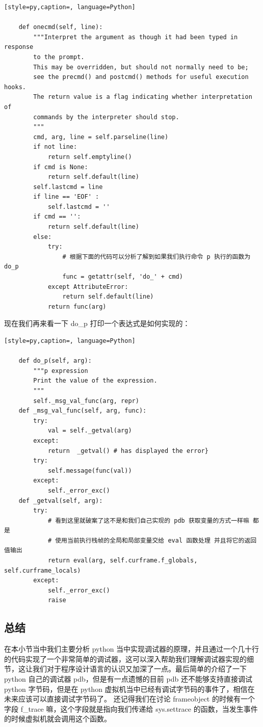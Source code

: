 \begin{lstlisting}[style=py,caption=, language=Python]

    def onecmd(self, line):
        """Interpret the argument as though it had been typed in response
        to the prompt.
        This may be overridden, but should not normally need to be;
        see the precmd() and postcmd() methods for useful execution hooks.
        The return value is a flag indicating whether interpretation of
        commands by the interpreter should stop.
        """
        cmd, arg, line = self.parseline(line)
        if not line:
            return self.emptyline()
        if cmd is None:
            return self.default(line)
        self.lastcmd = line
        if line == 'EOF' :
            self.lastcmd = ''
        if cmd == '':
            return self.default(line)
        else:
            try:
                # 根据下面的代码可以分析了解到如果我们执行命令 p 执行的函数为 do_p
                func = getattr(self, 'do_' + cmd)
            except AttributeError:
                return self.default(line)
            return func(arg)
\end{lstlisting}
现在我们再来看一下 do\_p 打印一个表达式是如何实现的：
\begin{lstlisting}[style=py,caption=, language=Python]

    def do_p(self, arg):
        """p expression
        Print the value of the expression.
        """
        self._msg_val_func(arg, repr)
    def _msg_val_func(self, arg, func):
        try:
            val = self._getval(arg)
        except:
            return  _getval() # has displayed the error}
        try:
            self.message(func(val))
        except:
            self._error_exc()
    def _getval(self, arg):
        try:
            # 看到这里就破案了这不是和我们自己实现的 pdb 获取变量的方式一样嘛 都是
            # 使用当前执行栈帧的全局和局部变量交给 eval 函数处理 并且将它的返回值输出
            return eval(arg, self.curframe.f_globals, self.curframe_locals)
        except:
            self._error_exc()
            raise
\end{lstlisting}
\subsection{总结}
在本小节当中我们主要分析 python 当中实现调试器的原理，并且通过一个几十行的代码实现了一个非常简单的调试器，这可以深入帮助我们理解调试器实现的细节，这让我们对于程序设计语言的认识又加深了一点。最后简单的介绍了一下 python 自己的调试器 pdb，但是有一点遗憾的目前 pdb 还不能够支持直接调试 python 字节码，但是在 python 虚拟机当中已经有调试字节码的事件了，相信在未来应该可以直接调试字节码了。
还记得我们在讨论 frameobject 的时候有一个字段 f\_trace 嘛，这个字段就是指向我们传递给 sys.settrace 的函数，当发生事件的时候虚拟机就会调用这个函数。

